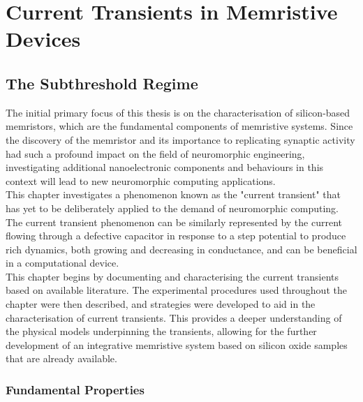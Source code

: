 \chapter{Current Transients in Memristive Devices}


\section[The Subthreshold Regime]{The Subthreshold Regime}

The initial primary focus of this thesis is on the characterisation of silicon-based memristors, which are the fundamental components of memristive systems. Since the discovery of the memristor and its importance to replicating synaptic activity had such a profound impact on the field of neuromorphic engineering, investigating additional nanoelectronic components and behaviours in this context will lead to new neuromorphic computing applications. \\

\noindent This chapter investigates a phenomenon known as the "current transient" that has yet to be deliberately applied to the demand of neuromorphic computing. The current transient phenomenon can be similarly represented by the current flowing through a defective capacitor in response to a step potential to produce rich dynamics, both growing and decreasing in conductance, and can be beneficial in a computational device. \\

\noindent This chapter begins by documenting and characterising the current transients based on available literature. The experimental procedures used throughout the chapter were then described, and strategies were developed to aid in the characterisation of current transients. This provides a deeper understanding of the physical models underpinning the transients, allowing for the further development of an integrative memristive system based on silicon oxide samples that are already available.

\subsection[Fundamental Properties]{Fundamental Properties}

